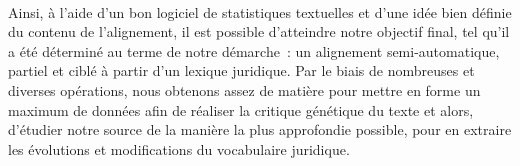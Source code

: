 \paragraph{} Ainsi, à l’aide d’un bon logiciel de statistiques textuelles et d’une idée bien définie du contenu de l’alignement, il est possible d’atteindre notre objectif final, tel qu’il a été déterminé au terme de notre démarche~: un alignement semi-automatique, partiel et ciblé à partir d’un lexique juridique. Par le biais de nombreuses et diverses opérations, nous obtenons assez de matière pour mettre en forme un maximum de données afin de réaliser la critique génétique du texte et alors, d’étudier notre source de la manière la plus approfondie possible, pour en extraire les évolutions et modifications du vocabulaire juridique.